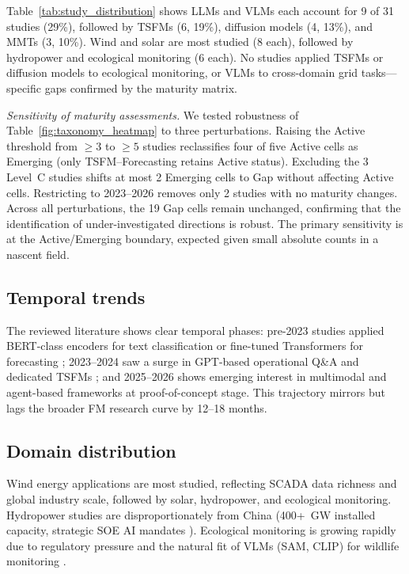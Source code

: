 \documentclass[preprint,12pt]{elsarticle}
\begin{document}
Table~\ref{tab:study_distribution} shows LLMs and VLMs each account for 9 of 31 studies (29\%), followed by TSFMs (6, 19\%), diffusion models (4, 13\%), and MMTs (3, 10\%). Wind and solar are most studied (8 each), followed by hydropower and ecological monitoring (6 each). No studies applied TSFMs or diffusion models to ecological monitoring, or VLMs to cross-domain grid tasks---specific gaps confirmed by the maturity matrix.

\textit{Sensitivity of maturity assessments.} We tested robustness of Table~\ref{fig:taxonomy_heatmap} to three perturbations. Raising the Active threshold from $\geq 3$ to $\geq 5$ studies reclassifies four of five Active cells as Emerging (only TSFM--Forecasting retains Active status). Excluding the 3 Level~C studies shifts at most 2 Emerging cells to Gap without affecting Active cells. Restricting to 2023--2026 removes only 2 studies with no maturity changes. Across all perturbations, the 19 Gap cells remain unchanged, confirming that the identification of under-investigated directions is robust. The primary sensitivity is at the Active/Emerging boundary, expected given small absolute counts in a nascent field.

\subsection{Temporal trends}
\label{subsec:temporal_trends}

The reviewed literature shows clear temporal phases: pre-2023 studies applied BERT-class encoders for text classification or fine-tuned Transformers for forecasting \cite{hanif2024transformer_solar}; 2023--2024 saw a surge in GPT-based operational Q\&A \cite{jin2024chatgrid, ren2024watergpt} and dedicated TSFMs \cite{garza2023timegpt, rasul2023lagllama, woo2024moirai, goswami2024moment, ansari2024chronos}; and 2025--2026 shows emerging interest in multimodal and agent-based frameworks \cite{liu2025repower_llm_power, zaboli2025llm_power_security} at proof-of-concept stage. This trajectory mirrors but lags the broader FM research curve by 12--18 months.

\subsection{Domain distribution}
\label{subsec:geo_distribution}

Wind energy applications are most studied, reflecting SCADA data richness and global industry scale, followed by solar, hydropower, and ecological monitoring. Hydropower studies are disproportionately from China (400+~GW installed capacity, strategic SOE AI mandates \cite{yang2023baichuan, bai2023qwen}). Ecological monitoring is growing rapidly due to regulatory pressure and the natural fit of VLMs (SAM, CLIP) for wildlife monitoring \cite{tuia2022wildlife_remote_sensing}.
\end{document}
